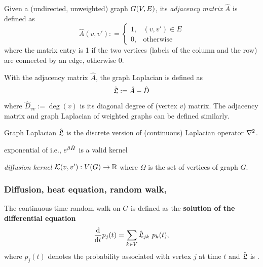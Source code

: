 \begin{definition}\label{def:adjacency_matrix}
	Given a (undirected, unweighted) graph $G(V,E)$, its \emph{adjacency matrix} $\hat{A}$ is defined as
	\begin{equation}
		\hat{A}(v,v') : = 
		\begin{cases}
			1, & (v,v') \in E \\
			0, & \text{otherwise}
		\end{cases}
	\end{equation}
	where the matrix entry is 1 if the two vertices (labels of the column and the row) are connected by an edge, otherwise 0.
\end{definition}
\begin{definition}\label{def:graph_laplacian}
	With the adjacency matrix $\hat{A}$, the graph Laplacian is defined as
	\begin{equation}
		\hat{\mathfrak{L}}:=\hat{A}-\hat{D}	
	\end{equation}
	where $\hat{D}_{vv}:=\deg(v)$ is its diagonal degree of (vertex $v$) matrix.
	The adjacency matrix and graph Laplacian of weighted graphs can be defined similarly.
\end{definition}
\begin{remark}
	Graph Laplacian $\hat{\mathfrak{L}}$ is the 
	discrete version of (continuous) Laplacian operator $\laplacian$.
\end{remark}
\begin{lemma}
	exponential of i.e., $e^{\beta \hat{H}}$ is a valid kernel
\end{lemma}
\begin{definition}\label{def:diffusion_kernel}
	\emph{diffusion kernel}
	$\mathcal{K}(v,v'):V(G)\to \mathbb{R}$ where $\Omega$ is the set of vertices of graph $G$.
\end{definition}

\subsubsection{Diffusion, heat equation, random walk,}
The continuous-time random walk on $G$ is defined as the \textbf{solution of the differential equation}
\begin{equation}
	\dv{t} p_j(t)
	=
	\sum_{k\in V} \hat{\mathfrak{L}}_{jk} \ p_k(t),
	\label{eq:continuous_time_random_walk}
\end{equation}
where $p_j(t)$ denotes the probability associated with vertex $j$ at time $t$
and $\hat{\mathfrak{L}}$ is .

